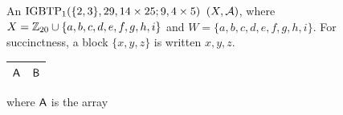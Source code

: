\documentclass[draft, 11pt]{article}
\begin{document}
\begin{figure}[h!]
 \caption{An ${\rm IGBTP}_1(\{2,3\},29, 14\times 25; 9,4\times 5)$ $(X,\mathcal A)$, where
 $X=\mathbb Z_{20}\cup\{a,b,c,d,e,f,g,h,i\}$ and $W=\{a,b,c,d,e,f,g,h,i\}$.
 For succinctness, a block $\{x,y,z\}$ is written $x,y,z$. 
 }
 \label{fig:igbtp}
 \end{figure}
 
\begin{figure}[h!]
\renewcommand{\arraystretch}{2}
 \setlength{\tabcolsep}{10pt} \centering \Large
\begin{tabular}{|c|c|}
\hline 
${\sf A}$ & ${\sf B}$\\
\hline
\end{tabular}

\vskip 5pt
\normalsize \flushleft where ${\sf A}$ is the array
\vskip 5pt


\end{figure}
\end{document}
